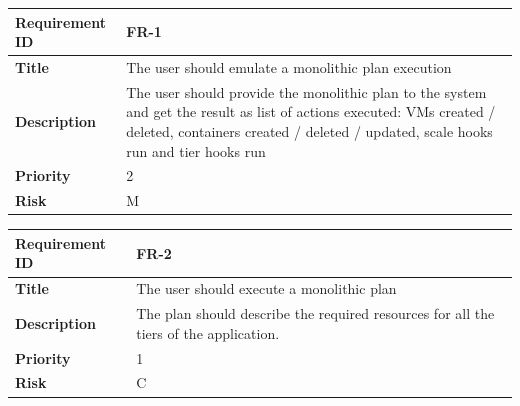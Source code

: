 \begin{table}[ht]
  \begin{tabular}{|p{3.5cm}|p{8cm}|}
  \hline
    \textbf{Requirement ID}  & FR-1 \\
  \hline
    \textbf{Title}  & \begin{sloppypar}The user should emulate a monolithic plan execution\end{sloppypar}\\
  \hline
    \textbf{Description}  & \begin{sloppypar}The user should provide the monolithic plan to the system and get the result as list of actions executed: VMs created / deleted, containers created / deleted / updated, scale hooks run and tier hooks run \end{sloppypar}\\
  \hline
    \textbf{Priority}  & 2\\
  \hline
    \textbf{Risk}  & M \\
  \hline
  \end{tabular}
\end{table}

\begin{table}[ht]
  \begin{tabular}{|p{3.5cm}|p{8cm}|}
  \hline
    \textbf{Requirement ID}  & FR-2 \\
  \hline
    \textbf{Title}  & \begin{sloppypar}The user should execute a monolithic plan\end{sloppypar}\\
  \hline
    \textbf{Description}  & \begin{sloppypar}The plan should describe the required resources for all the tiers of the application.\end{sloppypar}\\
  \hline
    \textbf{Priority}  & 1\\
  \hline
    \textbf{Risk}  & C \\
  \hline
  \end{tabular}
\end{table}

